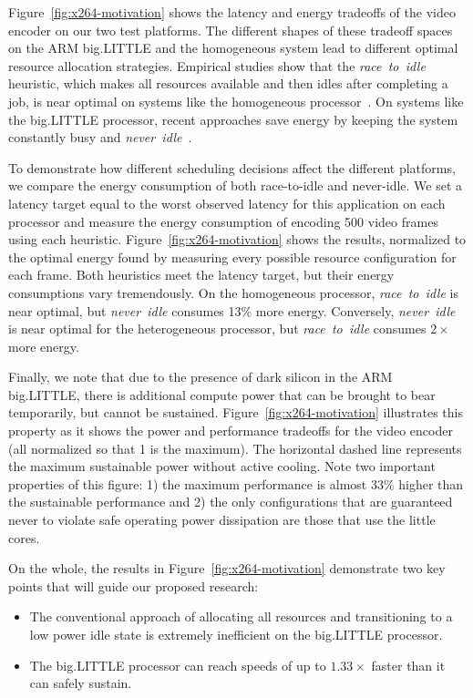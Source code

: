 Figure~\ref{fig:x264-motivation} shows the latency and energy
tradeoffs of the video encoder on our two test platforms.  The
different shapes of these tradeoff spaces on the ARM big.LITTLE and
the homogeneous system lead to different optimal resource allocation
strategies. Empirical studies show that the \emph{race~to~idle}
heuristic, which makes all resources available and then idles after
completing a job, is near optimal on systems like the homogeneous
processor~\cite{PowerSlope,Hoelzle2009,google2,Imes2014,HotPower}.  On
systems like the big.LITTLE processor, recent approaches save energy
by keeping the system constantly busy and
\emph{never~idle}~\cite{Carroll13,LeSueur11,Imes2014,HotPower}.

To demonstrate how different scheduling decisions affect the different
platforms, we compare the energy consumption of both race-to-idle and
never-idle.  We set a latency target equal to the worst observed
latency for this application on each processor and measure the energy
consumption of encoding 500 video frames using each heuristic.
Figure~\ref{fig:x264-motivation} shows the results, normalized to
the optimal energy found by measuring every possible resource
configuration for each frame.  Both heuristics meet the latency
target, but their energy consumptions vary tremendously. On the
homogeneous processor, \emph{race~to~idle} is near optimal, but
\emph{never~idle} consumes 13\% more energy.  Conversely,
\emph{never~idle} is near optimal for the heterogeneous processor, but
\emph{race~to~idle} consumes $2 \times$ more energy.

Finally, we note that due to the presence of dark silicon in the ARM
big.LITTLE, there is additional compute power that can be brought to
bear temporarily, but cannot be sustained.
Figure~\ref{fig:x264-motivation} illustrates this property as it
shows the power and performance tradeoffs for the video encoder (all
normalized so that 1 is the maximum).  The horizontal dashed line
represents the maximum sustainable power without active cooling.  Note
two important properties of this figure: 1) the maximum performance is
almost 33\% higher than the sustainable performance and 2) the only
configurations that are guaranteed never to violate safe operating
power dissipation are those that use the little cores.

On the whole, the results in Figure~\ref{fig:x264-motivation} demonstrate
two key points that will guide our proposed research:
\begin{itemize}\itemsep 0pt \parskip 0pt
\item The conventional approach of allocating all resources and
transitioning to a low power idle state is extremely inefficient on
the big.LITTLE processor.  
\item The big.LITTLE processor can reach speeds of up to $1.33 \times$
  faster than it can safely sustain.
\end{itemize}

